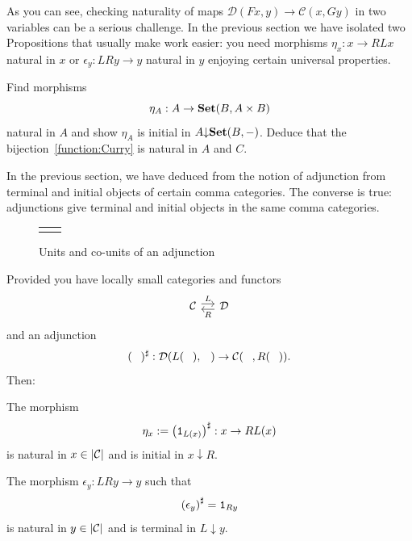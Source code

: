 As you can see, checking naturality of maps
\(\mathcal{D}(Fx, y) \to \mathcal{C}(x, Gy)\) in two variables can be a
serious challenge. In the previous section we have isolated two
Propositions that usually make work easier: you need morphisms
\(\eta_x : x \to RLx\) natural in \(x\) or \(\epsilon_y : LRy \to y\)
natural in \(y\) enjoying certain universal properties.

\begin{exercise}
  Find morphisms
  \[
    \eta_A : A \to \mathbf{Set}(B, A \times B)
  \]
  natural in \(A\) and show \(\eta_A\) is initial in
  \(A{\downarrow}\mathbf{Set}(B, -)\). Deduce that the
  bijection~\eqref{function:Curry} is natural in \(A\) and \(C\).
\end{exercise}

In the previous section, we have deduced from the notion of adjunction
from terminal and initial objects of certain comma categories. The
converse is true: adjunctions give terminal and initial objects in the
same comma categories.

\begin{figure}
  \begin{tabular}{c|c}
     & 
  \end{tabular}
  \caption{Units and co-units of an adjunction}
\end{figure}

\begin{proposition}\label{proposition:UnitsAndCounits}
  Provided you have locally small categories and functors
  \[
    \begin{tikzcd}[column sep=small]
      \mathcal{C} \ar["L", r, shift left] & \mathcal{D} \ar["R", l,
      shift left]
    \end{tikzcd}
  \]
  and an adjunction
  \[
    (\hole)^\sharp : \mathcal{D}(L(\hole), \hole) \to \mathcal{C}(\hole,
    R(\hole)) .
  \]
  Then:
  \begin{tcbenum}
  \item The morphism
    \[
      \eta_x := \left( \mathtt 1_{L(x)} \right)^\sharp : x \to RL(x)
    \]
    is natural in \(x \in \left\lvert\mathcal{C}\right\rvert\) and is initial in
    \(x {\downarrow} R\).
  \item The morphism \(\epsilon_y : LRy \to y\) such that
    \[
      \left( \epsilon_y \right)^\sharp = \mathtt 1_{Ry}
    \]
    is natural in \(y \in \left\lvert\mathcal{C}\right\rvert\) and is terminal in
    \(L {\downarrow} y\).
  \end{tcbenum}
\end{proposition}

